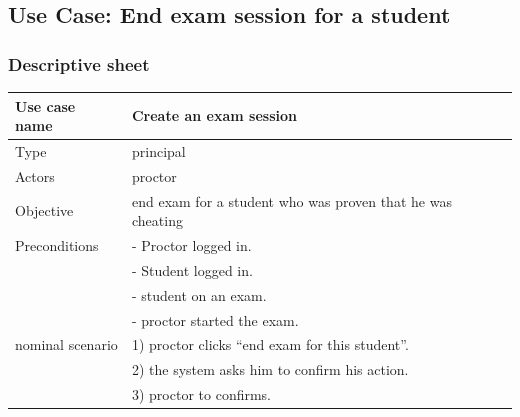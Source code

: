 \documentclass[]{uc2pfecaneva}
\begin{document}
    \begin{table}[h]
        \raggedright\subsection{Use Case: End exam session for a student}
        \subsubsection{Descriptive sheet}
        \centering
        \begin{tabularx}{\textwidth}{|l|X|}
            \hline
            Use case name         & Create an exam session                                                                                                 \\ \hline
            Type                  & principal                                                                                                              \\ \hline
            Actors                & proctor                                                                                                                \\ \hline
            Objective             & end exam for a student who was proven that he was cheating                                                             \\ \hline
            Preconditions
            & - Proctor logged in.                                                                                                   \\
            & - Student logged in.                                                                                                   \\
            & - student on an exam.                                                                                                  \\
            & - proctor started the exam.                                                                                            \\ \hline
            nominal scenario
            & 1) proctor clicks “end exam for this student”.                                                                         \\
            & 2) the system asks him to confirm his action.                                                                          \\
            & 3) proctor to confirms.                                                                                                \\

\end{tabularx}
\end{table}
\end{document}
